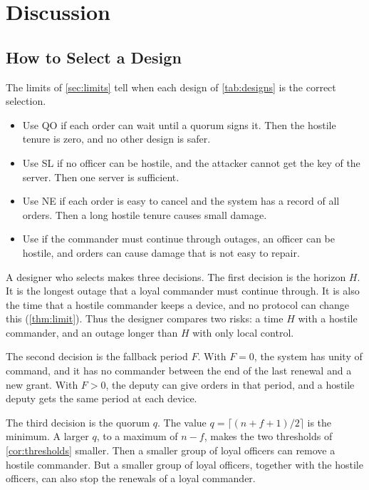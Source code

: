 \section{Discussion}
\label{sec:discussion}

\subsection{How to Select a Design}
\label{sec:select}

The limits of \cref{sec:limits} tell when each design of \cref{tab:designs} is the correct
selection.

\begin{itemize}
  \item Use QO if each order can wait until a quorum signs it. Then the hostile tenure is
  zero, and no other design is safer.
  \item Use SL if no officer can be hostile, and the attacker cannot get the key of the
  server. Then one server is sufficient.
  \item Use NE if each order is easy to cancel and the system has a record of all orders.
  Then a long hostile tenure causes small damage.
  \item Use \sys{} if the commander must continue through outages, an officer can be
  hostile, and orders can cause damage that is not easy to repair.
\end{itemize}

A designer who selects \sys{} makes three decisions. The first decision is the horizon
$H$. It is the longest outage that a loyal commander must continue through. It is also the
time that a hostile commander keeps a device, and no protocol can change this
(\cref{thm:limit}). Thus the designer compares two risks: a time $H$ with a hostile
commander, and an outage longer than $H$ with only local control.

The second decision is the fallback period $F$. With $F = 0$, the system has unity of
command, and it has no commander between the end of the last renewal and a new grant. With
$F > 0$, the deputy can give orders in that period, and a hostile deputy gets the same
period at each device.

The third decision is the quorum $q$. The value $q = \lceil (n + f + 1)/2 \rceil$ is the
minimum. A larger $q$, to a maximum of $n - f$, makes the two thresholds of
\cref{cor:thresholds} smaller. Then a smaller group of loyal officers can remove a hostile
commander. But a smaller group of loyal officers, together with the hostile officers, can
also stop the renewals of a loyal commander.

